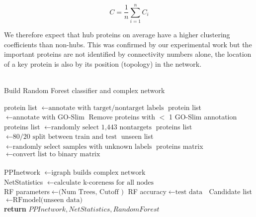 \documentclass[a4paper,8pt,twocolumn,5p]{elsarticle}
\begin{document}
\begin{equation}\label{watts}
    C = \frac{1}{n} \sum_{i=1}^n C_{i}
\end{equation}

We therefore expect that hub proteins on average have a higher clustering coefficients than non-hubs. This was confirmed by our experimental work but the important proteins are not identified by connectivity numbers alone, the location of a key protein is also by its position (topology) in the network.

\begin{algorithm}
\caption{\\Build Random Forest classifier and complex network}\label{alg1}
\begin{algorithmic}[1]
\scriptsize
{}
       \State \hspace{\algorithmicindent} protein list $\gets \mbox {annotate with target/nontarget labels}$
       \State \hspace{\algorithmicindent} protein list $\gets \mbox {annotate with GO-Slim}$
       \State \hspace{\algorithmicindent} Remove proteins with $<$ 1 GO-Slim annotation
       \State \hspace{\algorithmicindent} proteins list $\gets \mbox {randomly select 1,443 nontargets}$
       \State \hspace{\algorithmicindent} proteins list $\gets \mbox {80/20 split between train and test}$
       \State \hspace{\algorithmicindent} unseen list $\gets \mbox {randomly select samples with unknown labels}$
       \State \hspace{\algorithmicindent} proteins matrix $\gets \mbox {convert list to binary matrix}$
     \\ \\

    \hspace{\algorithmicindent} PPInetwork $\gets \mbox {igraph builds complex network }$\\
    \hspace{\algorithmicindent} NetStatistics $\gets \mbox {calculate k-coreness for all nodes }$\\
 
          \State\hspace{\algorithmicindent} RF parameters$\gets \mbox {(Num Trees, Cutoff )}$
          \State\hspace{\algorithmicindent} RF accuracy$\gets \mbox {test data }$
          \State\hspace{\algorithmicindent} Candidate list$\gets \mbox {RFmodel(unseen data)}$
   \EndWhile      \\
   
   
       \State \textbf{return} $PPInetwork, NetStatistics, RandomForest$
\EndProcedure
\normalsize
\end{algorithmic}
\end{algorithm}
\end{document}
